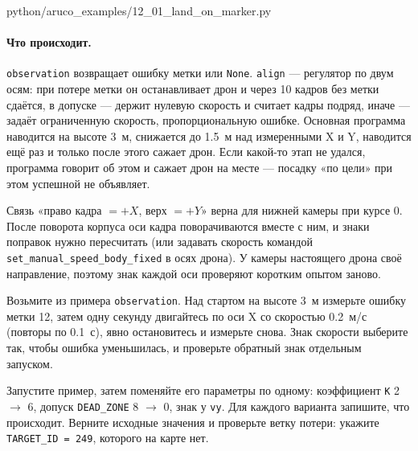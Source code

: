 \begin{codefile}[python]{python/aruco_examples/12_01_land_on_marker.py}
\end{codefile}

\paragraph{Что происходит.} \verb|observation| возвращает ошибку метки или \verb|None|. \verb|align| --- регулятор по двум осям: при потере метки он останавливает дрон и через 10 кадров без метки сдаётся, в допуске --- держит нулевую скорость и считает кадры подряд, иначе --- задаёт ограниченную скорость, пропорциональную ошибке. Основная программа наводится на высоте 3~м, снижается до 1.5~м над измеренными X и Y, наводится ещё раз и только после этого сажает дрон. Если какой-то этап не удался, программа говорит об этом и сажает дрон на месте --- посадку «по цели» при этом успешной не объявляет.

\begin{rulebox}
Связь «право кадра $= +X$, верх $= +Y$» верна для нижней камеры при курсе 0. После поворота корпуса оси кадра поворачиваются вместе с ним, и знаки поправок нужно пересчитать (или задавать скорость командой \verb|set_manual_speed_body_fixed| в осях дрона). У камеры настоящего дрона своё направление, поэтому знак каждой оси проверяют коротким опытом заново.
\end{rulebox}

\begin{taskbox}
Возьмите из примера \verb|observation|. Над стартом на высоте 3~м измерьте ошибку метки 12, затем одну секунду двигайтесь по оси X со скоростью 0.2~м/с (повторы по 0.1~с), явно остановитесь и измерьте снова. Знак скорости выберите так, чтобы ошибка уменьшилась, и проверьте обратный знак отдельным запуском.
\end{taskbox}

\begin{taskbox}
Запустите пример, затем поменяйте его параметры по одному: коэффициент \verb|K| 2 $\to$ 6, допуск \verb|DEAD_ZONE| 8 $\to$ 0, знак у \verb|vy|. Для каждого варианта запишите, что происходит. Верните исходные значения и проверьте ветку потери: укажите \verb|TARGET_ID = 249|, которого на карте нет.
\end{taskbox}

